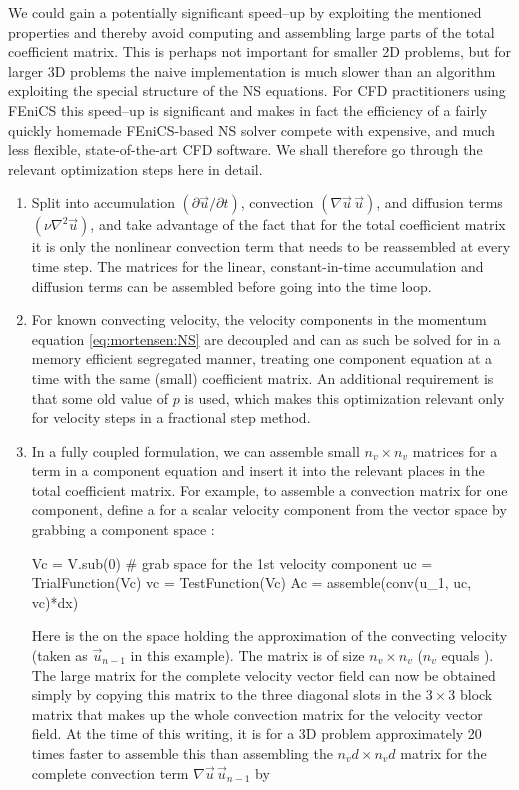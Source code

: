 We could gain a potentially significant speed--up by exploiting the
mentioned properties and thereby avoid computing and assembling large
parts of the total coefficient matrix. This is perhaps not important
for smaller 2D problems, but for larger 3D problems the naive
implementation is much slower than an algorithm exploiting the special
structure of the NS equations.  For CFD practitioners using FEniCS
this speed--up is significant and makes in fact the efficiency of a
fairly quickly homemade FEniCS-based NS solver compete with expensive,
and much less flexible, state-of-the-art CFD software.  We shall
therefore go through the relevant optimization steps here in detail.
\begin{enumerate}
 \item Split  into accumulation $(\partial \vec{u}/\partial t)$,
   convection $(\nabla \vec{u} \, \vec{u})$, and diffusion terms
   $(\nu\nabla^2 \vec{u})$, and take advantage of the fact that for the total
   coefficient matrix it is only the nonlinear convection term that
   needs to be reassembled at every time step. The matrices for the
   linear, constant-in-time accumulation and diffusion terms can be
   assembled before going into the time loop.

\item For known convecting velocity, the velocity components in
  the momentum equation \eqref{eq:mortensen:NS} are decoupled and
  can as such be solved for in a memory efficient segregated manner,
  treating one component equation at a time with the same (small)
  coefficient matrix. An additional requirement is that some old value
  of $p$ is used, which makes this optimization relevant only for
  velocity steps in a fractional step method.

\item In a fully coupled formulation, we can assemble small
  $n_v\times n_v$ matrices for a term in a component equation and
  insert it into the relevant places in the total coefficient matrix.
  For example, to assemble a convection matrix for one component,
  define a  for a scalar velocity component from
  the vector space  by grabbing a component space :
\begin{python}
Vc = V.sub(0)  # grab space for the 1st velocity component
uc = TrialFunction(Vc)
vc = TestFunction(Vc)
Ac = assemble(conv(u_1, uc, vc)*dx)
\end{python}
Here  is the  on the space  holding the
approximation of the convecting velocity (taken as $\vec{u}_{n-1}$ in
this example).  The matrix  is of size $n_v\times n_v$ ($n_v$
equals ).  The large matrix for the complete velocity
vector field can now be obtained simply by copying this 
matrix to the three diagonal slots in the $3\times 3$ block matrix
that makes up the whole convection matrix for the velocity vector
field.  At the time of this writing, it is for a 3D problem
approximately 20 times faster to assemble this  than
assembling the $n_vd\times n_vd$ matrix for the complete convection
term $\nabla \vec{u} \, \vec{u}_{n-1}$ by 


\end{enumerate}
